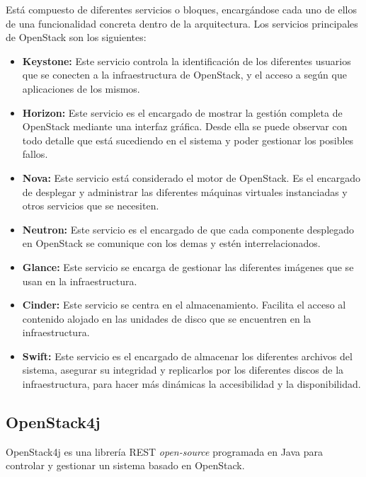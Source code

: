 Está compuesto de diferentes servicios o bloques, encargándose cada uno de ellos de una funcionalidad concreta dentro de la arquitectura. Los servicios principales de OpenStack son los siguientes:

\begin{itemize}
	\item \textbf{Keystone:}  Este servicio controla la identificación de los diferentes usuarios que se conecten a la infraestructura de OpenStack, y el acceso a según que aplicaciones de los mismos.
	
	\item \textbf{Horizon:} Este servicio es el encargado de mostrar la gestión completa de OpenStack mediante una interfaz gráfica. Desde ella se puede observar con todo detalle que está sucediendo en el sistema y poder gestionar los posibles fallos.
	
	\item \textbf{Nova:} Este servicio está considerado el motor de OpenStack. Es el encargado de desplegar y administrar las diferentes máquinas virtuales instanciadas y otros servicios que se necesiten.
	
	\item \textbf{Neutron:} Este servicio es el encargado de que cada componente desplegado en OpenStack se comunique con los demas y estén interrelacionados.
	
	\item \textbf{Glance:} Este servicio se encarga de gestionar las diferentes imágenes que se usan en la infraestructura.
	
	\item \textbf{Cinder:} Este servicio se centra en el almacenamiento. Facilita el acceso al contenido alojado en las unidades de disco que se encuentren en la infraestructura.
	
	\item \textbf{Swift:} Este servicio es el encargado de almacenar los diferentes archivos del sistema, asegurar su integridad y replicarlos por los diferentes discos de la infraestructura, para hacer más dinámicas la accesibilidad y la disponibilidad.
\end{itemize}

\subsection{OpenStack4j}
\label{subsec:openstack4j}

OpenStack4j es una librería REST \textit{open-source} programada en Java para controlar y gestionar un sistema basado en OpenStack.

